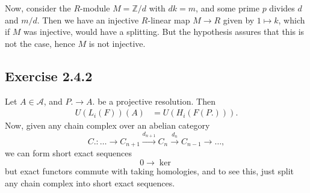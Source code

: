 \documentclass{article}
\theoremstyle{definition}
\newcommand{\Z}{\mathbb{Z}}
\begin{document}
Now, consider the $R$-module $M = \Z/d$ with $dk = m$, and some prime $p$
divides $d$ and $m/d$. Then we have an injective $R$-linear map $M \to R$ given
by $1 \mapsto k$, which if $M$ was injective, would have a splitting. But the
hypothesis assures that this is not the case, hence $M$ is not injective.

\subsection*{Exercise 2.4.2}

Let $A \in \mathcal{A}$, and $P. \to A.$ be a projective resolution. Then 
\begin{align*}
	U(L_i(F))(A)
	&=
	U(H_i(F(P.))).
\end{align*}
Now, given any chain complex over an abelian category
\[
	C. : 
	\ldots \rightarrow 
	C_{n + 1} \xrightarrow{d_{n + 1}}
	C_{n} \xrightarrow{d_{n}}
	C_{n - 1} \rightarrow
	\ldots,
\] 
we can form short exact sequences  
\[
	0 \rightarrow
	\ker
\] 
but exact functors commute with taking homologies, and to see this, just split any
chain complex into short exact sequences. 
\end{document}
